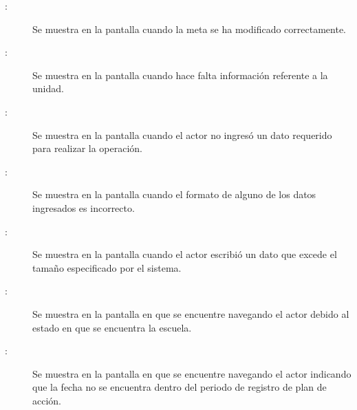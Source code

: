 \begin{description}
	\item[:] Se muestra en la pantalla  cuando la meta se ha modificado correctamente.
	\item[:] Se muestra en la pantalla  cuando hace falta información referente a la unidad.
	\item[:] Se muestra en la pantalla  cuando el actor no ingresó un dato requerido para realizar la operación.
	\item[:] Se muestra en la pantalla  cuando el formato de alguno de los datos ingresados es incorrecto.
	\item[:] Se muestra en la pantalla  cuando el actor escribió un dato que excede el tamaño especificado por el sistema.
	\item[:] Se muestra en la pantalla en que se encuentre navegando el actor debido al estado en que se encuentra la escuela.	
	\item[:] Se muestra en la pantalla en que se encuentre navegando el actor indicando que la fecha no se encuentra dentro del periodo de registro de plan de acción.
\end{description}
